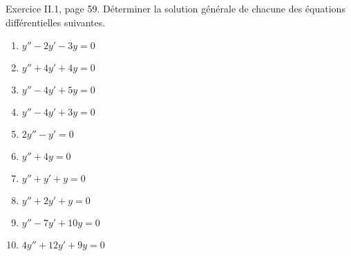 \begin{exercice}\label{exoEquaDiff0010}

Exercice II.1, page 59. Déterminer la solution générale de chacune des équations différentielles suivantes.
\begin{multicols}{2}
	\begin{enumerate}
		\item
			$y''-2y'-3y=0$
		\item
			$y''+4y'+4y=0$
		\item
			$y''-4y'+5y=0$
		\item
			$y''-4y'+3y=0$
		\item
			$2y''-y'=0$
		\item
			$y''+4y=0$
		\item
			$y''+y'+y=0$
		\item
			$y''+2y'+y=0$
		\item
			$y''-7y'+10y=0$
		\item
			$4y''+12y'+9y=0$
	\end{enumerate}
\end{multicols}

\end{exercice}
